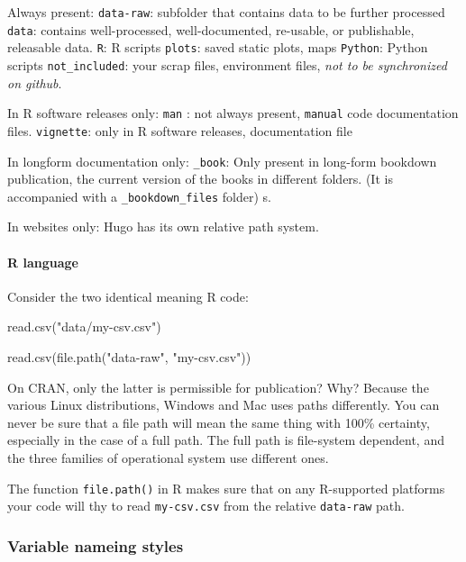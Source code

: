 \documentclass[
  fontsize=13pt,
  english,
  a4paper,
  openany, a4paper, oneside]{article}
\newenvironment{Shaded}{\begin{snugshade}}{\end{snugshade}}
\newcommand{\FunctionTok}[1]{\textcolor[rgb]{0.00,0.00,0.00}{#1}}
\newcommand{\NormalTok}[1]{#1}
\newcommand{\StringTok}[1]{\textcolor[rgb]{0.31,0.60,0.02}{#1}}
\begin{document}
Always present:
\texttt{data-raw}: subfolder that contains data to be further processed
\texttt{data}: contains well-processed, well-documented, re-usable, or publishable, releasable data.
\texttt{R}: R scripts
\texttt{plots}: saved static plots, maps
\texttt{Python}: Python scripts
\texttt{not\_included}: your scrap files, environment files, \emph{not to be synchronized on github}.

In R software releases only:
\texttt{man} : not always present, \texttt{manual} code documentation files.
\texttt{vignette}: only in R software releases, documentation file

In longform documentation only:
\texttt{\_book}: Only present in long-form bookdown publication, the current version of the books in different folders. (It is accompanied with a \texttt{\_bookdown\_files} folder)
s.

In websites only:
Hugo has its own relative path system.

\hypertarget{R-guide}{%
\paragraph{R language}\label{R-guide}}

Consider the two identical meaning R code:

\begin{Shaded}
\begin{Highlighting}[]
\FunctionTok{read.csv}\NormalTok{(}\StringTok{"data/my{-}csv.csv"}\NormalTok{)}

\FunctionTok{read.csv}\NormalTok{(}\FunctionTok{file.path}\NormalTok{(}\StringTok{"data{-}raw"}\NormalTok{, }\StringTok{"my{-}csv.csv"}\NormalTok{))}
\end{Highlighting}
\end{Shaded}

On CRAN, only the latter is permissible for publication? Why? Because the various Linux distributions, Windows and Mac uses paths differently. You can never be sure that a file path will mean the same thing with 100\% certainty, especially in the case of a full path. The full path is file-system dependent, and the three families of operational system use different ones.

The function \texttt{file.path()} in R makes sure that on any R-supported platforms your code will thy to read \texttt{my-csv.csv} from the relative \texttt{data-raw} path.

\hypertarget{variable-nameing-styles}{%
\subsubsection{Variable nameing styles}\label{variable-nameing-styles}}
\end{document}
